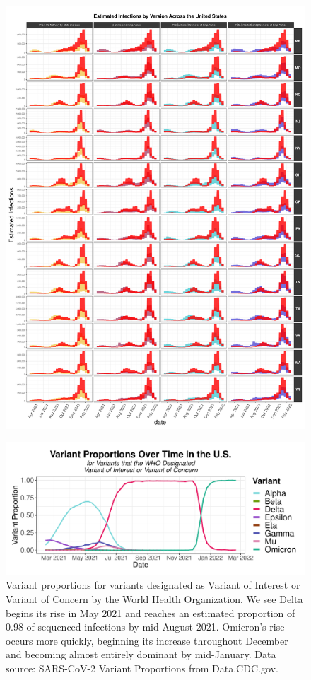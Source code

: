 \documentclass[12pt,twoside]{smiththesis}
\begin{document}
\begin{figure}
\includegraphics[width=1\linewidth]{figure/state_comp_covidestim2} \caption{\label{fig:state-results-2}}\label{fig:unnamed-chunk-5}
\end{figure}
\begin{figure}
\includegraphics[width=1\linewidth]{figure/variant_prop} \caption{\label{fig:variant-prop}Variant proportions for variants designated as Variant of Interest or Variant of Concern by the World Health Organization. We see Delta begins its rise in May 2021 and reaches an estimated proportion of 0.98 of sequenced infections by mid-August 2021. Omicron's rise occurs more quickly, beginning its increase throughout December and becoming almost entirely dominant by mid-January.
Data source: SARS-CoV-2 Variant Proportions from Data.CDC.gov.}\label{fig:unnamed-chunk-6}
\end{figure}
\end{document}
